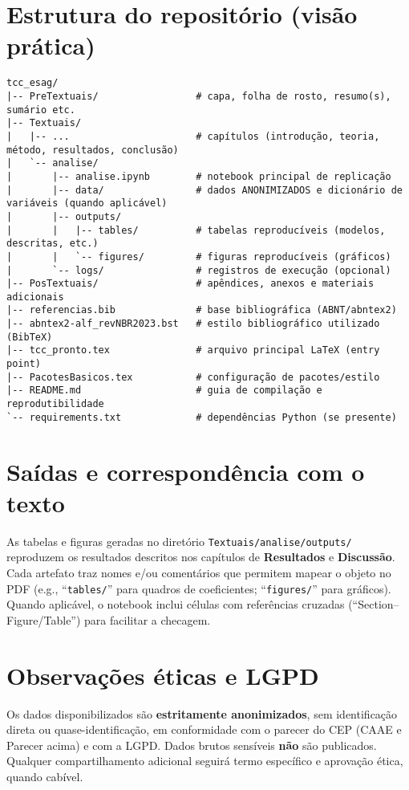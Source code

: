 \begin{apendicesenv}
\section{Estrutura do repositório (visão prática)}
\begin{verbatim}
tcc_esag/
|-- PreTextuais/                 # capa, folha de rosto, resumo(s), sumário etc.
|-- Textuais/
|   |-- ...                      # capítulos (introdução, teoria, método, resultados, conclusão)
|   `-- analise/
|       |-- analise.ipynb        # notebook principal de replicação
|       |-- data/                # dados ANONIMIZADOS e dicionário de variáveis (quando aplicável)
|       |-- outputs/
|       |   |-- tables/          # tabelas reproducíveis (modelos, descritas, etc.)
|       |   `-- figures/         # figuras reproducíveis (gráficos)
|       `-- logs/                # registros de execução (opcional)
|-- PosTextuais/                 # apêndices, anexos e materiais adicionais
|-- referencias.bib              # base bibliográfica (ABNT/abntex2)
|-- abntex2-alf_revNBR2023.bst   # estilo bibliográfico utilizado (BibTeX)
|-- tcc_pronto.tex               # arquivo principal LaTeX (entry point)
|-- PacotesBasicos.tex           # configuração de pacotes/estilo
|-- README.md                    # guia de compilação e reprodutibilidade
`-- requirements.txt             # dependências Python (se presente)
\end{verbatim}

\section{Saídas e correspondência com o texto}
As tabelas e figuras geradas no diretório \texttt{Textuais/analise/outputs/} reproduzem os resultados descritos nos capítulos de \textbf{Resultados} e \textbf{Discussão}. Cada artefato traz nomes e/ou comentários que permitem mapear o objeto no PDF (e.g., ``\texttt{tables/}'' para quadros de coeficientes; ``\texttt{figures/}'' para gráficos). Quando aplicável, o notebook inclui células com referências cruzadas (``Section--Figure/Table'') para facilitar a checagem.

\section{Observações éticas e LGPD}
Os dados disponibilizados são \textbf{estritamente anonimizados}, sem identificação direta ou quase-identificação, em conformidade com o parecer do CEP (CAAE e Parecer acima) e com a LGPD. Dados brutos sensíveis \textbf{não} são publicados. Qualquer compartilhamento adicional seguirá termo específico e aprovação ética, quando cabível.


\end{apendicesenv}
